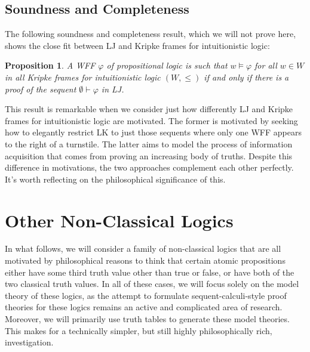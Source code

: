 \documentclass[11pt]{article}
\newtheorem{proposition}[theorem]{Proposition}
\theoremstyle{definition}
\theoremstyle{remark}
\begin{document}
\subsection{Soundness and Completeness}
The following soundness and completeness result, which we will not prove here, shows the close fit between LJ and Kripke frames for intuitionistic logic:
\begin{proposition}
    A WFF $\varphi$ of propositional logic is such that $w\vDash\varphi$ for all $w\in W$ in all Kripke frames for intuitionistic logic $(W,\leq)$ if and only if there is a proof of the sequent $\emptyset\vdash\varphi$ in LJ.
\end{proposition}
\noindent
This result is remarkable when we consider just how differently LJ and Kripke frames for intuitionistic logic are motivated. The former is motivated by seeking how to elegantly restrict LK to just those sequents where only one WFF appears to the right of a turnstile. The latter aims to model the process of information acquisition that comes from proving an increasing body of truths. Despite this difference in motivations, the two approaches complement each other perfectly. It's worth reflecting on the philosophical significance of this.\par 

\section{Other Non-Classical Logics}
In what follows, we will consider a family of non-classical logics that are all motivated by philosophical reasons to think that certain atomic propositions either have some third truth value other than true or false, or have both of the two classical truth values. In all of these cases, we will focus solely on the model theory of these logics, as the attempt to formulate sequent-calculi-style proof theories for these logics remains an active and complicated area of research. Moreover, we will primarily use truth tables to generate these model theories. This makes for a technically simpler, but still highly philosophically rich, investigation.
\end{document}

